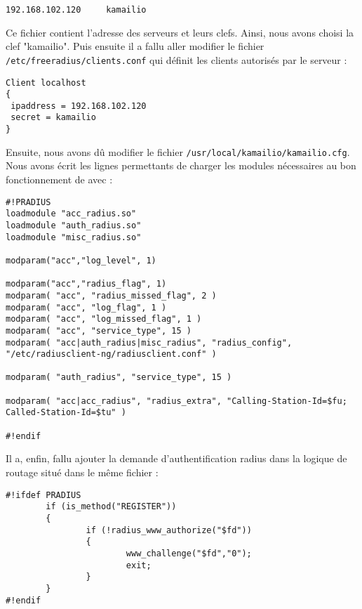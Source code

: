\begin{verbatim}
192.168.102.120		kamailio
\end{verbatim}

Ce fichier contient l'adresse des serveurs {\rad} et leurs clefs. Ainsi, nous avons choisi la clef "kamailio".
Puis ensuite il a fallu aller modifier le fichier \texttt{/etc/freeradius/clients.conf} qui définit les clients autorisés par le serveur {\frad} :

\begin{verbatim}
Client localhost
{
 ipaddress = 192.168.102.120
 secret = kamailio
}
\end{verbatim}

Ensuite, nous avons dû modifier le fichier \texttt{/usr/local/kamailio/kamailio.cfg}. Nous avons écrit les lignes permettants de charger les modules nécessaires au bon fonctionnement de {\kam} avec {\frad} :
\begin{small}
\begin{verbatim}
#!PRADIUS
loadmodule "acc_radius.so"
loadmodule "auth_radius.so"
loadmodule "misc_radius.so"

modparam("acc","log_level", 1)

modparam("acc","radius_flag", 1)
modparam( "acc", "radius_missed_flag", 2 )
modparam( "acc", "log_flag", 1 )
modparam( "acc", "log_missed_flag", 1 )
modparam( "acc", "service_type", 15 )
modparam( "acc|auth_radius|misc_radius", "radius_config", "/etc/radiusclient-ng/radiusclient.conf" )

modparam( "auth_radius", "service_type", 15 )

modparam( "acc|acc_radius", "radius_extra", "Calling-Station-Id=$fu; Called-Station-Id=$tu" )

#!endif
\end{verbatim}
\end{small}

Il a, enfin, fallu ajouter la demande d'authentification radius dans la logique de routage situé dans le même fichier :

\begin{verbatim}
#!ifdef PRADIUS
        if (is_method("REGISTER"))
        {
                if (!radius_www_authorize("$fd"))
                {
                        www_challenge("$fd","0");
                        exit;
                }
        }
#!endif
\end{verbatim}



